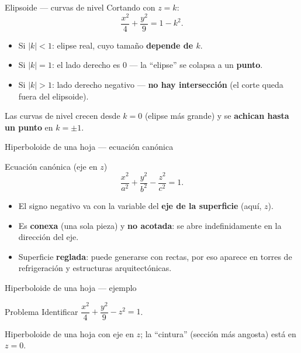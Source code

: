 \documentclass[11pt,aspectratio=169]{beamer}
\begin{document}
\begin{frame}{Elipsoide --- curvas de nivel}
  Cortando con $z=k$:
  \[
    \frac{x^2}{4}+\frac{y^2}{9}=1-k^2.
  \]
  \pause
  \begin{itemize}
    \item Si $|k|<1$: elipse real, cuyo tamaño \textbf{depende de $k$}.
    \pause
    \item Si $|k|=1$: el lado derecho es $0$ --- la ``elipse'' se colapsa a un \textbf{punto}.
    \pause
    \item Si $|k|>1$: lado derecho negativo --- \textbf{no hay intersección} (el corte queda fuera del elipsoide).
  \end{itemize}
  \pause
  \begin{center}\normalsize\color{tealx}
  Las curvas de nivel crecen desde $k=0$ (elipse más grande) y se \textbf{achican hasta un punto} en $k=\pm1$.
  \end{center}
\end{frame}


\begin{frame}{Hiperboloide de una hoja --- ecuación canónica}
  \begin{block}{Ecuación canónica (eje en $z$)}
    \[
      \frac{x^2}{a^2}+\frac{y^2}{b^2}-\frac{z^2}{c^2}=1.
    \]
  \end{block}
  \pause
  \begin{itemize}
    \item El signo negativo va con la variable del \textbf{eje de la superficie} (aquí, $z$).
    \pause
    \item Es \textbf{conexa} (una sola pieza) y \textbf{no acotada}: se abre indefinidamente en la dirección del eje.
    \pause
    \item Superficie \textbf{reglada}: puede generarse con rectas, por eso aparece en torres de refrigeración y estructuras arquitectónicas.
  \end{itemize}
\end{frame}

\begin{frame}{Hiperboloide de una hoja --- ejemplo}
  \begin{block}{Problema}
    Identificar $\dfrac{x^2}{4}+\dfrac{y^2}{9}-z^2=1$.
  \end{block}
  \pause
  \begin{center}\normalsize\color{tealx}
  Hiperboloide de una hoja con eje en $z$; la ``cintura'' (sección más angosta) está en $z=0$.
  \end{center}
\end{frame}
\end{document}
